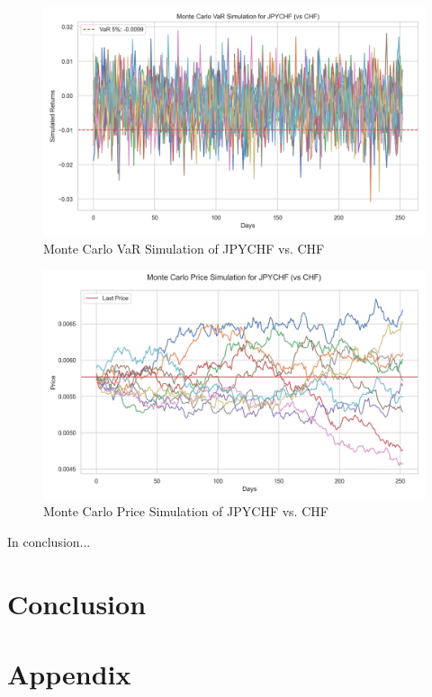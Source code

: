 \documentclass[a4paper, 12pt]{article}
\begin{document}
\begin{figure}[h]
    \centering
    \includegraphics[width=0.75\linewidth]{reports/figures/monte_carlo_var_simulation_JPYCHF_vs_CHF.png}
    \caption{Monte Carlo VaR Simulation of JPYCHF vs. CHF}   \label{fig:monte_carlo_var_simulation_JPYCHF_vs_CHF}
\end{figure}

\begin{figure}[h]
    \centering
    \includegraphics[width=0.75\linewidth]{reports/figures/monte_carlo_price_simulation_JPYCHF_vs_CHF.png}
    \caption{Monte Carlo Price Simulation of JPYCHF vs. CHF}  \label{fig:monte_carlo_price_simulation_JPYCHF_vs_CHF}
\end{figure}

In conclusion...

\section{Conclusion}
\section*{Appendix}
\end{document}
